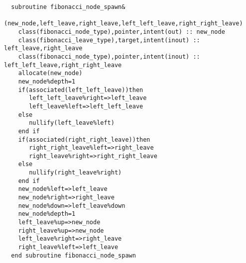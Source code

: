 \begin{Verbatim}
  subroutine fibonacci_node_spawn&
    (new_node,left_leave,right_leave,left_left_leave,right_right_leave)
    class(fibonacci_node_type),pointer,intent(out) :: new_node
    class(fibonacci_leave_type),target,intent(inout) :: left_leave,right_leave
    class(fibonacci_node_type),pointer,intent(inout) :: left_left_leave,right_right_leave
    allocate(new_node)
    new_node%depth=1
    if(associated(left_left_leave))then
       left_left_leave%right=>left_leave
       left_leave%left=>left_left_leave
    else
       nullify(left_leave%left)
    end if
    if(associated(right_right_leave))then
       right_right_leave%left=>right_leave
       right_leave%right=>right_right_leave
    else
       nullify(right_leave%right)
    end if
    new_node%left=>left_leave
    new_node%right=>right_leave
    new_node%down=>left_leave%down
    new_node%depth=1
    left_leave%up=>new_node
    right_leave%up=>new_node
    left_leave%right=>right_leave
    right_leave%left=>left_leave
  end subroutine fibonacci_node_spawn
\end{Verbatim}

